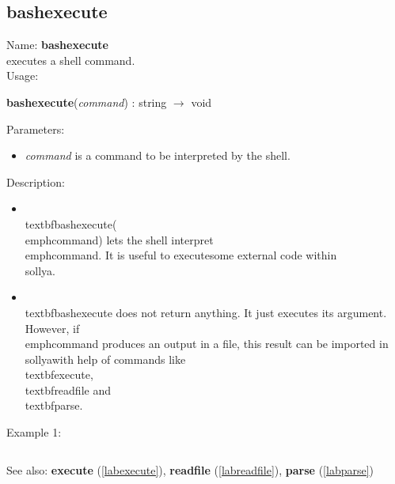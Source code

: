 \subsection{bashexecute}
\label{labbashexecute}
\noindent Name: \textbf{bashexecute}\\
executes a shell command.\\
\noindent Usage: 
\begin{center}
\textbf{bashexecute}(\emph{command}) : \textsf{string} $\rightarrow$ \textsf{void}\\
\end{center}
Parameters: 
\begin{itemize}
\item \emph{command} is a command to be interpreted by the shell.
\end{itemize}
\noindent Description: \begin{itemize}

\item \\textbf{bashexecute}(\\emph{command}) lets the shell interpret \\emph{command}. It is useful to execute\n   some external code within \\sollya.\n
\item \\textbf{bashexecute} does not return anything. It just executes its argument. However, if\n   \\emph{command} produces an output in a file, this result can be imported in \\sollya\n   with help of commands like \\textbf{execute}, \\textbf{readfile} and \\textbf{parse}.\n\end{itemize}
\noindent Example 1: 
\begin{center}\begin{minipage}{15cm}\begin{Verbatim}[frame=single]
\end{Verbatim}
\end{minipage}\end{center}
See also: \textbf{execute} (\ref{labexecute}), \textbf{readfile} (\ref{labreadfile}), \textbf{parse} (\ref{labparse})
